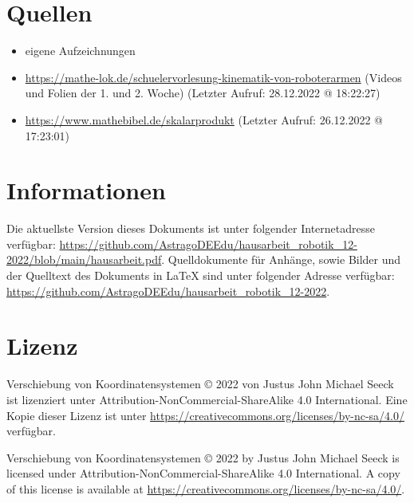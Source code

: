 \documentclass{article}
\begin{document}


    \newpage

    \section{Quellen}

    \begin{itemize}
        \item eigene Aufzeichnungen
        \item \url{https://mathe-lok.de/schuelervorlesung-kinematik-von-roboterarmen} (Videos und Folien der 1. und 2. Woche) (Letzter Aufruf: 28.12.2022 @ 18:22:27)
        \item \url{https://www.mathebibel.de/skalarprodukt} (Letzter Aufruf: 26.12.2022 @ 17:23:01)
    \end{itemize}

    \section{Informationen}

    Die aktuellste Version dieses Dokuments ist unter folgender Internetadresse verfügbar:
    \url{https://github.com/AstragoDEEdu/hausarbeit_robotik_12-2022/blob/main/hausarbeit.pdf}.
    Quelldokumente für Anhänge, sowie Bilder und der Quelltext des Dokuments in \LaTeX{} sind unter folgender Adresse verfügbar:
    \url{https://github.com/AstragoDEEdu/hausarbeit_robotik_12-2022}.

    \section{Lizenz}

    Verschiebung von Koordinatensystemen © 2022 von Justus John Michael Seeck ist lizenziert unter Attribution-NonCommercial-ShareAlike 4.0 International.
    Eine Kopie dieser Lizenz ist unter \url{https://creativecommons.org/licenses/by-nc-sa/4.0/} verfügbar.

    Verschiebung von Koordinatensystemen © 2022 by Justus John Michael Seeck is licensed under Attribution-NonCommercial-ShareAlike 4.0 International.
    A copy of this license is available at \url{https://creativecommons.org/licenses/by-nc-sa/4.0/}.
\end{document}
